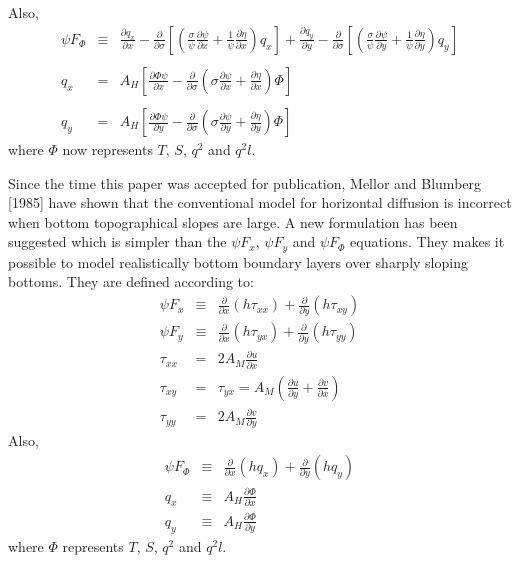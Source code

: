 \documentclass[oribibl]{llncs}
\begin{document}
Also,
\begin{eqnarray}
\psi F_\Phi &\equiv& \frac{\partial q_{x}}{\partial x} -\frac{\partial}{\partial \sigma} \left[ \left(  \frac{\sigma}{\psi} \frac{\partial \psi}{\partial x} + \frac{1}{\psi} \frac{\partial \eta}{\partial x} \right) q_{x}  \right] +  \frac{\partial q_{y}}{\partial y} -\frac{\partial}{\partial \sigma} \left[ \left(  \frac{\sigma}{\psi} \frac{\partial \psi}{\partial y} + \frac{1}{\psi} \frac{\partial \eta}{\partial y} \right) q_{y}  \right]   \\ 
\nonumber \\ 
q_x &=&  A_H \left[ \frac{\partial \Phi \psi}{\partial x} - \frac{\partial}{\partial \sigma} \left( \sigma \frac{\partial \psi}{\partial x} + \frac{\partial \eta}{\partial x}  \right) \Phi \right]   \\ 
\nonumber \\ 
q_y &=&  A_H \left[ \frac{\partial \Phi \psi}{\partial y} - \frac{\partial}{\partial \sigma} \left( \sigma \frac{\partial \psi}{\partial y} + \frac{\partial \eta}{\partial y}  \right) \Phi \right] 
\end{eqnarray}
where $\Phi$ now represents $T$, $S$, $q^2$ and $q^2 l$.

Since the time this paper was accepted for publication, Mellor and Blumberg [1985] have shown that the conventional model for horizontal diffusion is incorrect when bottom topographical slopes are large. A new formulation has been suggested which is simpler than the $\psi F_x$, $\psi F_y$ and $\psi F_\Phi$ equations. They makes it possible to model realistically bottom boundary layers over sharply sloping bottoms. They are defined according to:
\begin{eqnarray}
\psi F_x &\equiv& \frac{\partial}{\partial x} (h\tau_{xx}) + \frac{\partial}{\partial y} (h\tau_{xy}) \\
\psi F_y &\equiv& \frac{\partial}{\partial x} (h\tau_{yx}) + \frac{\partial}{\partial y} (h\tau_{yy}) \\
\tau_{xx} &=& 2A_M\frac{\partial u}{\partial x}  \\
\tau_{xy} &=& \tau_{yx} = A_M(\frac{\partial u}{\partial y}+\frac{\partial v}{\partial x})  \\
\tau_{yy} &=& 2A_M \frac{\partial v}{\partial y} 
\end{eqnarray}
Also,
\begin{eqnarray}
\psi F_\Phi &\equiv& \frac{\partial}{\partial x}(hq_x) + \frac{\partial}{\partial y}(hq_y) \\
q_x &\equiv& A_H\frac{\partial \Phi}{\partial x} \\
q_y &\equiv& A_H\frac{\partial \Phi}{\partial y}
\end{eqnarray}
where $\Phi$ represents $T$, $S$, $q^2$ and $q^2 l$. 
\end{document}
